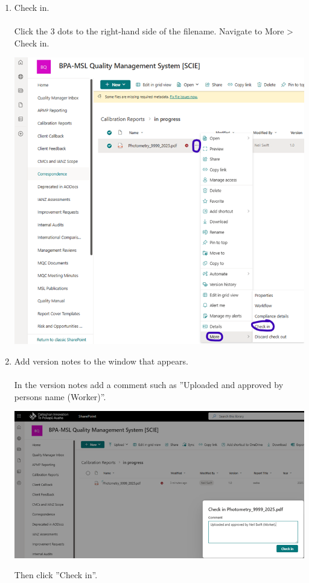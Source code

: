 \begin{enumerate}
\item Check in. 
\\
\\Click the 3 dots to the right-hand side of the filename.  Navigate to More > Check in.
\begin{center}
\includegraphics[scale=.55]{pictures/Step5_pic1}
\end{center}

\item Add version notes to the window that appears.
\\
\\In the version notes add a comment such as ''Uploaded and approved by persons name (Worker)''.
\begin{center}
\includegraphics[scale=.55]{pictures/Step6_pic1}
\end{center}
Then click ''Check in''.


\end{enumerate}
